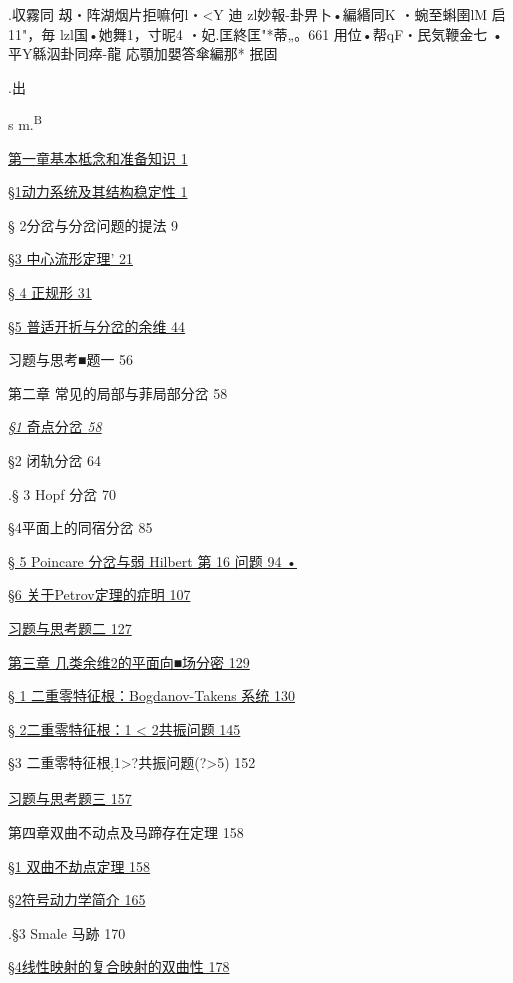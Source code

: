 \documentclass{article}
\begin{document}
.収霧同 刼・阵湖烟片拒嘛何l・\textless{}Y 迪 zl妙報-卦畀卜•編緡同K
・蜿至蝌圉lM 启 11"，毎 lzl国•她舞1，寸昵4 ・妃.匡終匡"*蒂„。661
用位•帮qF・民気鞭金七 •平Y緜泅卦同瘁-龍 応顎加嬰答傘編那* 抿固

.出

s m.\textsuperscript{B}

\protect\hyperlink{bookmark6}{第一童基本柢念和准备知识 1}

\protect\hyperlink{bookmark10}{§1动力系统及其结构稳定性 1}

§ 2分岔与分岔问题的提法 9

\protect\hyperlink{bookmark23}{§3 中心流形定理' 21}

\protect\hyperlink{bookmark32}{§ 4 正规形 31}

\protect\hyperlink{bookmark40}{§5 普适开折与分岔的余维 44}

习题与思考■题一 56

第二章 常见的局部与菲局部分岔 58

\protect\hyperlink{bookmark51}{\emph{§1} 奇点分岔 \emph{58}}

§2 闭轨分岔 64

.§ 3 Hopf 分岔 70

§4平面上的同宿分岔 85

\protect\hyperlink{bookmark86}{§ 5 Poincare 分岔与弱 Hilbert 第 16 问题
94 •}

\protect\hyperlink{bookmark100}{§6 关于Petrov定理的症明 107}

\protect\hyperlink{bookmark118}{习题与思考题二 127}

\protect\hyperlink{bookmark123}{第三章 几类余维2的平面向■场分密 129}

\protect\hyperlink{bookmark126}{§ 1 二重零特征根：Bogdanov-Takens 系统
130}

\protect\hyperlink{bookmark146}{§ 2二重零特征根：1 \textless{} 2共振问题
145}

§3
二重零特征根\textsubscript{:}1\textgreater{}?共振问题(?\textgreater{}5)
152

\protect\hyperlink{bookmark157}{习题与思考题三 157}

第四章双曲不动点及马蹄存在定理 158

\protect\hyperlink{bookmark162}{§1 双曲不劫点定理 158}

\protect\hyperlink{bookmark184}{§2符号动力学简介 165}

.§3 Smale 马跡 170

\protect\hyperlink{bookmark210}{§4线性映射的复合映射的双曲性 178}
\end{document}
